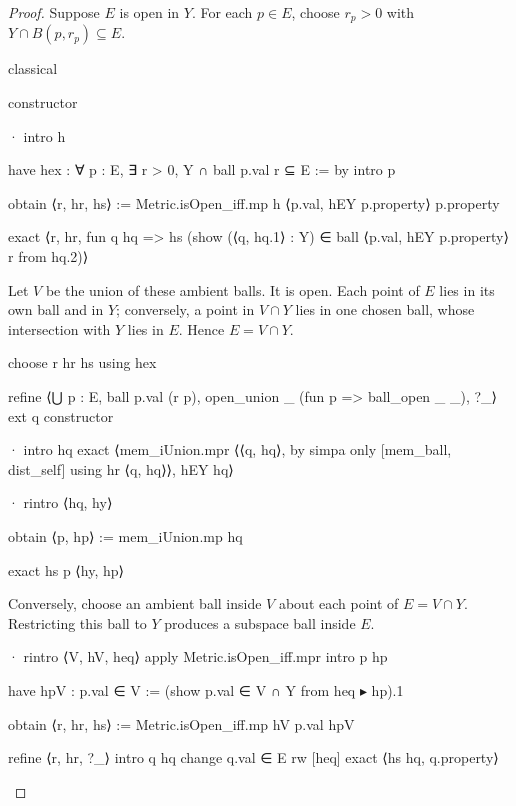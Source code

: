 \begin{proof}
  Suppose $E$ is open in $Y$.
  For each $p\in E$, choose $r_p>0$ with $Y\cap B(p,r_p)\subseteq E$.

  \begin{lean}
    classical

    constructor

    · intro h

      have hex : ∀ p : E, ∃ r > 0, Y ∩ ball p.val r ⊆ E := by
        intro p

        obtain ⟨r, hr, hs⟩ := Metric.isOpen_iff.mp h ⟨p.val, hEY p.property⟩ p.property

        exact ⟨r, hr, fun q hq =>
          hs (show (⟨q, hq.1⟩ : Y) ∈ ball ⟨p.val, hEY p.property⟩ r from hq.2)⟩
  \end{lean}

  Let $V$ be the union of these ambient balls.
  It is open.
  Each point of $E$ lies in its own ball and in $Y$; conversely, a point in $V\cap Y$ lies in one
  chosen ball, whose intersection with $Y$ lies in $E$.
  Hence $E=V\cap Y$.

  \begin{lean}
    choose r hr hs using hex

    refine ⟨⋃ p : E, ball p.val (r p), open_union _ (fun p => ball_open _ _), ?_⟩
    ext q
    constructor

    · intro hq
      exact ⟨mem_iUnion.mpr ⟨⟨q, hq⟩, by simpa only [mem_ball, dist_self] using hr ⟨q, hq⟩⟩, hEY hq⟩

    · rintro ⟨hq, hy⟩

      obtain ⟨p, hp⟩ := mem_iUnion.mp hq

      exact hs p ⟨hy, hp⟩
  \end{lean}

  Conversely, choose an ambient ball inside $V$ about each point of $E=V\cap Y$.
  Restricting this ball to $Y$ produces a subspace ball inside $E$.

  \begin{lean}
    · rintro ⟨V, hV, heq⟩
      apply Metric.isOpen_iff.mpr
      intro p hp

      have hpV : p.val ∈ V := (show p.val ∈ V ∩ Y from heq ▸ hp).1

      obtain ⟨r, hr, hs⟩ := Metric.isOpen_iff.mp hV p.val hpV

      refine ⟨r, hr, ?_⟩
      intro q hq
      change q.val ∈ E
      rw [heq]
      exact ⟨hs hq, q.property⟩
  \end{lean}

\end{proof}
